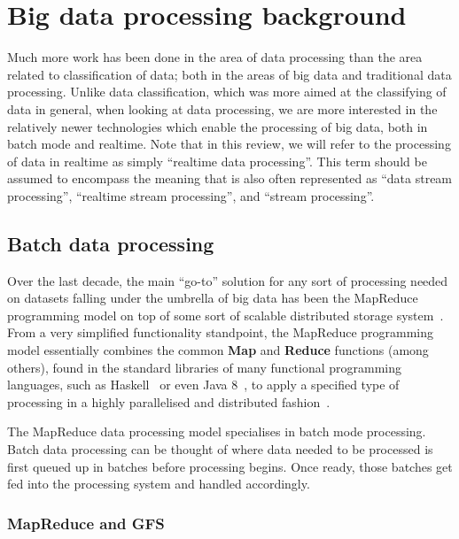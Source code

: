 \documentclass[a4paper,11pt]{article}
\begin{document}
\section{Big data processing background} %
\label{sec:big_data_processing_background}

Much more work has been done in the area of data processing than the area related to classification of data; both in the
areas of big data and traditional data processing. Unlike data classification, which was more aimed at the classifying
of data in general, when looking at data processing, we are more interested in the relatively newer technologies which
enable the processing of big data, both in batch mode and realtime. Note that in this review, we will refer to the
processing of data in realtime as simply ``realtime data processing''. This term should be assumed to encompass the
meaning that is also often represented as ``data stream processing'', ``realtime stream processing'', and ``stream
processing''.

\subsection{Batch data processing} %
\label{sub:batch_data_processing}

Over the last decade, the main ``go-to'' solution for any sort of processing needed on datasets falling under the
umbrella of big data has been the MapReduce programming model on top of some sort of scalable distributed storage
system~\cite{bifet_mining_2013}. From a very simplified functionality standpoint, the MapReduce programming model essentially
combines the common \textbf{Map} and \textbf{Reduce} functions (among others), found in the standard libraries of many functional
programming languages, such as Haskell~\cite{lammel2008google} or even Java 8~\cite{su2014changing}, to apply a specified
type of processing in a highly parallelised and distributed fashion~\cite{yang2007map}.

The MapReduce data processing model specialises in batch mode processing. Batch data processing can be thought of where
data needed to be processed is first queued up in batches before processing begins. Once ready, those batches get fed
into the processing system and handled accordingly. %

\subsubsection{MapReduce and GFS} %
\label{ssub:mapreduce_and_gfs}
\end{document}
